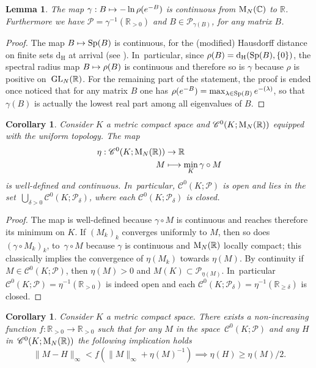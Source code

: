 \documentclass[10pt]{amsart}
\newcommand\mto{\mathchoice{\longmapsto}{\mapsto}{\mapsto}{\mapsto}}
\let\Re\relax
\DeclareMathOperator{\Re}{Re}
\newtheorem{lem}[prop]{Lemma}
\newtheorem{coro}[prop]{Corollary}
\theoremstyle{definition}
\newcommand\R{\mathbb{R}}
\newcommand\dd{\mathrm{d}}
\renewcommand\H{\mathrm{H}}
\begin{document}
\begin{lem}\label{lem:gampet}
The map $\gamma:B\mto -\ln \rho(e^{-B})$ is continuous from $\textnormal{M}_N(\mathbb{C})$ to $\R$. Furthermore we have $\mathscr{P} = \gamma^{-1}(\R_{>0})$ and $B\in\mathscr{P}_{\gamma(B)}$, for any matrix $B$.
\end{lem}
\begin{proof}
The map $B\mto \textnormal{Sp}(B)$ is continuous, for the (modified) Hausdorff distance on finite sets $\dd_{\H}$ at arrival (see \cite[Th.\,5.2]{serre}). In~particular, since $\rho(B) = \dd_{\H}(\textnormal{Sp}(B),\{0\})$, the spectral radius map $B\mto \rho(B)$ is continuous and therefore so is $\gamma$ because $\rho$ is positive on~$\textnormal{GL}_N(\mathbb{R})$. For the remaining part of the statement, the proof is ended once noticed that for any matrix $B$ one has $\rho(e^{-B}) = \max_{\lambda \in\textnormal{Sp}(B)} e^{-\Re(\lambda)}$, so that $\gamma(B)$ is actually the lowest real part among all eigenvalues of $B$.
\end{proof}
\begin{coro}\label{coro:thetapet}
Consider $K$ a metric compact space and $\mathscr{C}^0(K;\textnormal{M}_N(\R))$ equipped with the uniform topology. The map
\begin{align*}
\eta:\mathscr{C}^0(K;\textnormal{M}_N(\R)) &\to\R\\
M &\mto \min_K \gamma \circ M
\end{align*}
is well-defined and continuous. In~particular, $\mathscr{C}^0(K;\mathscr{P})$ is open and lies in the set~$\bigcup_{\delta>0}\mathscr{C}^0(K;\mathscr{P}_\delta)$, where each $\mathscr{C}^0(K;\mathscr{P}_\delta)$ is closed.
\end{coro}
\begin{proof}
The map is well-defined because $\gamma\circ M$ is continuous and reaches therefore its minimum on $K$. If $(M_k)_k$ converges uniformly to $M$, then so does $(\gamma \circ M_k)_k$, to~$\gamma \circ M$ because $\gamma$ is continuous and $\textnormal{M}_N(\mathbb{R})$ locally compact; this classically implies the convergence of $\eta(M_k)$ towards $\eta(M)$. By continuity if $M\in\mathscr{C}^0(K;\mathscr{P})$, then $\eta(M)>0$ and $M(K)\subset\mathscr{P}_{\eta(M)}$. In~particular $\mathscr{C}^0(K;\mathscr{P}) = \eta^{-1}(\R_{>0})$ is indeed open and each $\mathscr{C}^0(K;\mathscr{P}_\delta) = \eta^{-1}(\R_{\geq \delta})$ is closed.
\end{proof}
\begin{coro}\label{coro:etahold}
Consider $K$ a metric compact space. There exists a non-increasing function $f:\R_{>0}\to\R_{>0}$ such that for any $M$ in the space~$\mathscr{C}^{0}(K;\mathscr{P})$ and any $H$ in~$\mathscr{C}^0(K;\textnormal{M}_N(\R))$ the following implication holds
\[
\|M-H\|_\infty < f(\|M\|_\infty+\eta(M)^{-1})\implies \eta(H)\geq \eta(M)/2.
\]
\end{coro}
\end{document}
